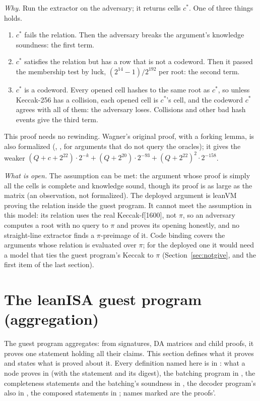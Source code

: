 \documentclass[11pt]{article}
\begin{document}
\emph{Why.} Run the extractor on the adversary; it returns cells $c^*$. One of three things holds.
\begin{enumerate}
\item $c^*$ fails the relation. Then the adversary breaks the argument's knowledge soundness:
the first term.
\item $c^*$ satisfies the relation but has a row that is not a codeword. Then it passed the
membership test by luck, $(2^{14}-1)/2^{192}$ per root: the second term.
\item $c^*$ is a codeword. Every opened cell hashes to the same root as $c^*$, so unless Keccak-256
has a collision, each opened cell is $c^*$'s cell, and the codeword $c^*$ agrees with all of them:
the adversary loses. Collisions and other bad hash events give the third term.
\end{enumerate}
This proof needs no rewinding. Wagner's original proof, with a forking lemma, is also formalized
(, , for arguments that do not query the oracles); it gives
the weaker $(Q + c + 2^{22})\cdot 2^{-k} + (Q + 2^{20})\cdot 2^{-93} + (Q + 2^{22})^2\cdot 2^{-158}$.

\emph{What is open.} The assumption can be met: the argument whose proof is simply all the cells
is complete and knowledge sound, though its proof is as large as the matrix (an observation, not
formalized). The deployed argument is leanVM proving the relation inside the guest program. It cannot
meet the assumption in this model: its relation uses the real Keccak-f[1600], not $\pi$, so an
adversary computes a root with no query to $\pi$ and proves its opening honestly, and no
straight-line extractor finds a $\pi$-preimage of it. Code binding covers the arguments whose
relation is evaluated over $\pi$; for the deployed one it would need a model that ties the guest
program's Keccak to $\pi$ (Section~\ref{sec:notgive}, and the first item of the last section).

\section{The leanISA guest program (aggregation)}\label{sec:guest}

The guest program aggregates: from signatures, DA matrices and child proofs, it proves one statement
holding all their claims. This section defines what it proves and states what is proved about it.
Every definition named here is in : what a node proves in
 (with the statement and its digest), the batching program
in , the completeness statements and the batching's
soundness in , the decoder program's also in
, the composed statements in ; names
marked  are the proofs'.
\end{document}
